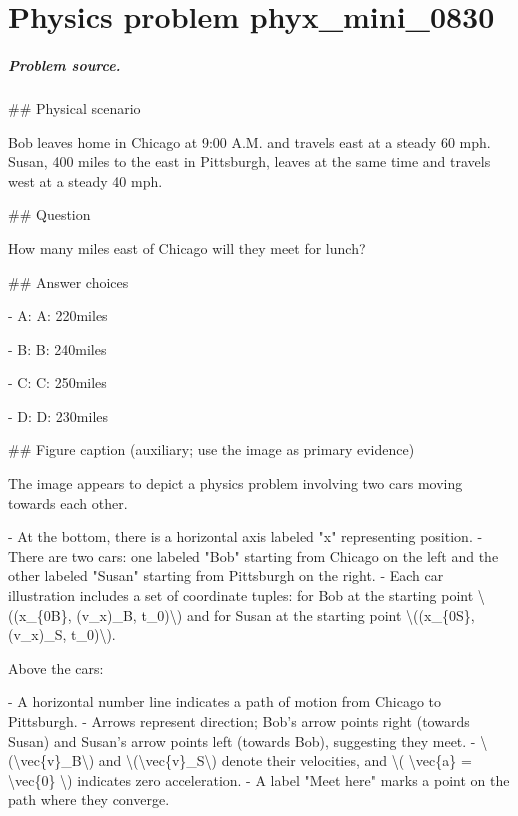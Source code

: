
\chapter{Physics problem phyx\_mini\_0830}
\label{ch:PhyXMiniProblems_problem_phyx_mini_0830}

\paragraph{Problem source.}
\#\# Physical scenario

Bob leaves home in Chicago at 9:00 A.M. and travels east at a steady 60 mph. Susan, 400 miles to the east in Pittsburgh, leaves at the same time and travels west at a steady 40 mph.

\#\# Question

How many miles east of Chicago will they meet for lunch?

\#\# Answer choices

- A: A: 220miles

- B: B: 240miles

- C: C: 250miles

- D: D: 230miles

\#\# Figure caption (auxiliary; use the image as primary evidence)

The image appears to depict a physics problem involving two cars moving towards each other. 

- At the bottom, there is a horizontal axis labeled "x" representing position. 
- There are two cars: one labeled "Bob" starting from Chicago on the left and the other labeled "Susan" starting from Pittsburgh on the right.
- Each car illustration includes a set of coordinate tuples: for Bob at the starting point \textbackslash{}((x\_\{0B\}, (v\_x)\_B, t\_0)\textbackslash{}) and for Susan at the starting point \textbackslash{}((x\_\{0S\}, (v\_x)\_S, t\_0)\textbackslash{}).

Above the cars:

- A horizontal number line indicates a path of motion from Chicago to Pittsburgh. 
- Arrows represent direction; Bob’s arrow points right (towards Susan) and Susan’s arrow points left (towards Bob), suggesting they meet.
- \textbackslash{}(\textbackslash{}vec\{v\}\_B\textbackslash{}) and \textbackslash{}(\textbackslash{}vec\{v\}\_S\textbackslash{}) denote their velocities, and \textbackslash{}( \textbackslash{}vec\{a\} = \textbackslash{}vec\{0\} \textbackslash{}) indicates zero acceleration.
- A label "Meet here" marks a point on the path where they converge.

